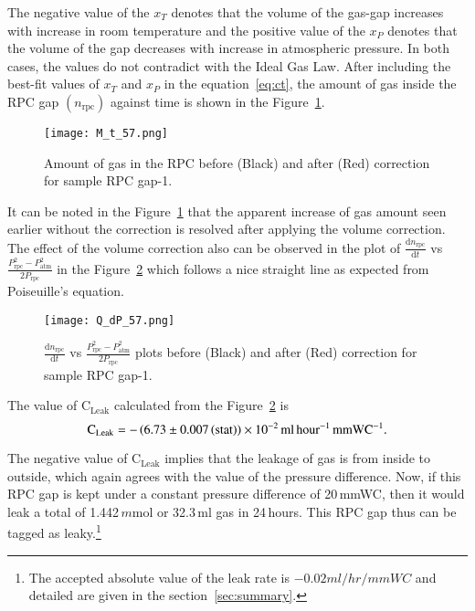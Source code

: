 The negative value of the $x_T$ denotes that the volume of the gas-gap
increases with increase in room temperature and the positive value of the
$x_P$ denotes that the volume of the gap decreases with increase in atmospheric
pressure. In both cases, the values do not contradict with the Ideal Gas Law.
After including the best-fit values of $x_T$ and $x_P$ in the
equation~\ref{eq:ct}, the amount of gas inside the RPC gap
$\left(n_{\textrm{rpc}}\right)$ against time is shown in the Figure~\ref{fig:with}.
\begin{figure}[h]
  \centering
  \texttt{[image: M\_t\_57.png]}
  \caption{Amount of gas in the RPC before (Black) and after (Red) correction
    for sample RPC gap-1.
  }
  \label{fig:with}
\end{figure} 
It can be noted in the Figure~\ref{fig:with} that the apparent
increase of gas amount seen earlier without the correction is resolved
after applying the volume correction. The effect of the volume
correction also can be observed in the plot of
$\frac{\mathrm{d}n_{\textrm{rpc}}}{\mathrm{d}t}$ vs
$\frac{P_{\textrm{rpc}}^{2}-P_{\textrm{atm}}^{2}}{2P_{\textrm{rpc}}}$ in the
Figure~\ref{fig:qt} which follows a nice straight line as expected
from Poiseuille's equation.
\begin{figure}[h]
  \centering
  \texttt{[image: Q\_dP\_57.png]}
  \caption{$\frac{\mathrm{d}n_{\textrm{rpc}}}{\mathrm{d}t}$ vs
    $\frac{P_{\textrm{rpc}}^{2}-P_{\textrm{atm}}^{2}}{2P_{\textrm{rpc}}}$ plots before
    (Black) and after (Red) correction for sample RPC gap-1.}
  \label{fig:qt}
\end{figure}

The value of $\textrm{C}_{\textrm{Leak}}$ calculated from the
Figure~\ref{fig:qt} is
\[\textrm{C}_{\textrm{Leak}}=-\left(6.73\pm 0.007\left(\textrm{stat}\right)\right)\times 10^{-2}\textrm{\,ml\,hour$^{-1}$\,mmWC$^{-1}$}.\]

The negative value of $\textrm{C}_{\textrm{Leak}}$ implies that the
leakage of gas is from inside to outside, which again agrees with the
value of the pressure difference. Now, if this RPC gap is kept under a
constant pressure difference of 20\,mmWC, then it would leak a total
of 1.442\,$m$mol or 32.3\,ml gas in 24\,hours. This RPC gap thus can
be tagged as leaky.\footnote{The accepted absolute value of the leak rate is
 $-0.02ml/hr/mmWC$ and detailed are given in the section~\ref{sec:summary}.}

